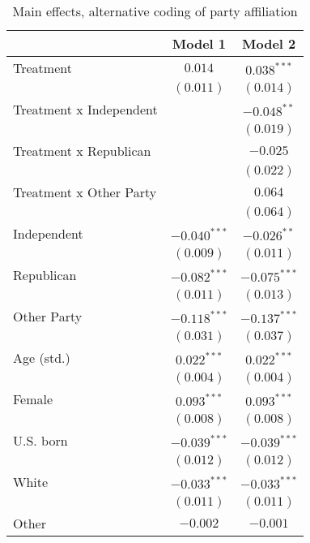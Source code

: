 
\begin{table}
\caption{Main effects, alternative coding of party affiliation}
\begin{center}
\begin{tabular}{l c c}
\toprule
 & Model 1 & Model 2 \\
\midrule
Treatment               & $0.014$        & $0.038^{***}$  \\
                        & $(0.011)$      & $(0.014)$      \\
Treatment x Independent &                & $-0.048^{**}$  \\
                        &                & $(0.019)$      \\
Treatment x Republican  &                & $-0.025$       \\
                        &                & $(0.022)$      \\
Treatment x Other Party &                & $0.064$        \\
                        &                & $(0.064)$      \\
Independent             & $-0.040^{***}$ & $-0.026^{**}$  \\
                        & $(0.009)$      & $(0.011)$      \\
Republican              & $-0.082^{***}$ & $-0.075^{***}$ \\
                        & $(0.011)$      & $(0.013)$      \\
Other Party             & $-0.118^{***}$ & $-0.137^{***}$ \\
                        & $(0.031)$      & $(0.037)$      \\
Age (std.)              & $0.022^{***}$  & $0.022^{***}$  \\
                        & $(0.004)$      & $(0.004)$      \\
Female                  & $0.093^{***}$  & $0.093^{***}$  \\
                        & $(0.008)$      & $(0.008)$      \\
U.S. born               & $-0.039^{***}$ & $-0.039^{***}$ \\
                        & $(0.012)$      & $(0.012)$      \\
White                   & $-0.033^{***}$ & $-0.033^{***}$ \\
                        & $(0.011)$      & $(0.011)$      \\
Other                   & $-0.002$       & $-0.001$       \\

\end{tabular}
\end{center}
\end{table}
